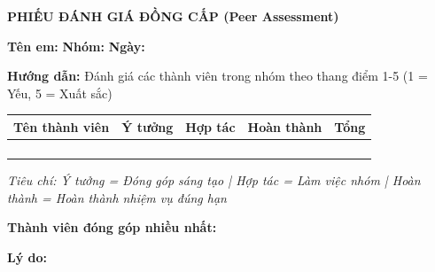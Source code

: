 \documentclass[12pt,a4paper]{article}
\begin{document}
\underline{\hspace{0.95\textwidth}}

\underline{\hspace{0.95\textwidth}}

\newpage
\begin{center}
{\Large\bfseries\sffamily\color{primary} PHIẾU ĐÁNH GIÁ ĐỒNG CẤP (Peer Assessment)}
\end{center}

\vspace{0.3cm}
\noindent\textbf{Tên em:} \underline{\hspace{4cm}} \hfill \textbf{Nhóm:} \underline{\hspace{2cm}} \hfill \textbf{Ngày:} \underline{\hspace{2cm}}

\vspace{0.5cm}
\textbf{Hướng dẫn:} Đánh giá các thành viên trong nhóm theo thang điểm 1-5 (1 = Yếu, 5 = Xuất sắc)

\vspace{0.3cm}
\begin{tabularx}{\textwidth}{|L|c|c|c|c|}
\hline
{}
\sffamily\bfseries Tên thành viên & \sffamily\bfseries Ý tưởng & \sffamily\bfseries Hợp tác & \sffamily\bfseries Hoàn thành & \sffamily\bfseries Tổng \\
\hline
\underline{\hspace{4cm}} & \underline{\hspace{1cm}} & \underline{\hspace{1cm}} & \underline{\hspace{1cm}} & \underline{\hspace{1cm}} \\
\hline
\underline{\hspace{4cm}} & \underline{\hspace{1cm}} & \underline{\hspace{1cm}} & \underline{\hspace{1cm}} & \underline{\hspace{1cm}} \\
\hline
\underline{\hspace{4cm}} & \underline{\hspace{1cm}} & \underline{\hspace{1cm}} & \underline{\hspace{1cm}} & \underline{\hspace{1cm}} \\
\hline
\underline{\hspace{4cm}} & \underline{\hspace{1cm}} & \underline{\hspace{1cm}} & \underline{\hspace{1cm}} & \underline{\hspace{1cm}} \\
\hline
\end{tabularx}

\vspace{0.3cm}
\textit{\footnotesize Tiêu chí: Ý tưởng = Đóng góp sáng tạo | Hợp tác = Làm việc nhóm | Hoàn thành = Hoàn thành nhiệm vụ đúng hạn}

\vspace{0.5cm}
\textbf{Thành viên đóng góp nhiều nhất:} \underline{\hspace{4cm}}

\textbf{Lý do:} \underline{\hspace{10cm}}
\end{document}
